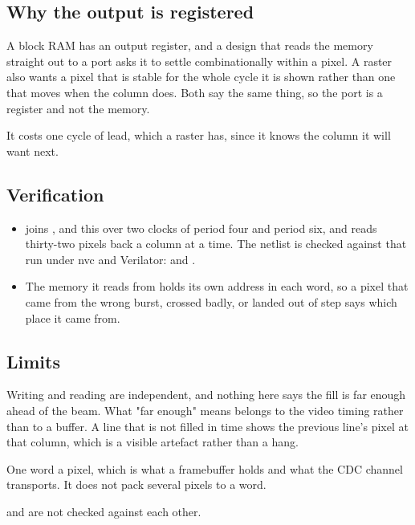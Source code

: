 \subsection*{Why the output is registered}

A block RAM has an output register, and a design that reads the
memory straight out to a port asks it to settle combinationally
within a pixel. A raster also wants a pixel that is stable for the
whole cycle it is shown rather than one that moves when the column
does. Both say the same thing, so the port is a register and not the
memory.

It costs one cycle of lead, which a raster has, since it knows the
column it will want next.

\subsection*{Verification}

\begin{itemize}
\item {} joins ,  and
this over two clocks of period four and period six, and reads
thirty-two pixels back a column at a time. The netlist is checked
against that run under nvc and Verilator:
 and
.
\item The memory it reads from holds its own address in each word, so
a pixel that came from the wrong burst, crossed badly, or landed out
of step says which place it came from.
\end{itemize}

\subsection*{Limits}

Writing and reading are independent, and nothing here says the fill
is far enough ahead of the beam. What "far enough" means belongs to
the video timing rather than to a buffer. A line that is not filled
in time shows the previous line's pixel at that column, which is a
visible artefact rather than a hang.

One word a pixel, which is what a framebuffer holds and what the
CDC channel transports. It does not pack several pixels to a word.

 and  are not checked against each other.

